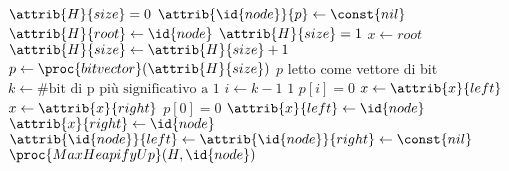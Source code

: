 \begin{codebox}
\li \If $\attrib{H}{size} = 0$
\li     \Then
            $\attrib{\id{node}}{p} \gets \const{nil}$
\li         $\attrib{H}{root} \gets \id{node}$
\li         $\attrib{H}{size} = 1$
\li     \Else
\li         $x \gets root$
\li         $\attrib{H}{size} \gets \attrib{H}{size} + 1$
\li         $p \gets \proc{bitvector}(\attrib{H}{size})$
            \Comment $p$ letto come vettore di bit
\li         $k \gets \# \text{bit di p più significativo a 1}$
\li         \For $i \gets k-1$  \To $1$
\li             \Do 
                    \If $p[i] = 0$
\li                     \Then
                            $x \gets \attrib{x}{left}$
\li                     \Else 
\li                         $x \gets \attrib{x}{right}$
                    \End
            \End
\li         \If $p[0] = 0$
\li             \Then
                    $\attrib{x}{left} \gets \id{node}$
\li             \Else
\li                 $\attrib{x}{right} \gets \id{node}$
            \End
    \End
\li $\attrib{\id{node}}{left} \gets \attrib{\id{node}}{right} \gets \const{nil}$
\li $\proc{MaxHeapifyUp}(H, \id{node})$
\end{codebox}